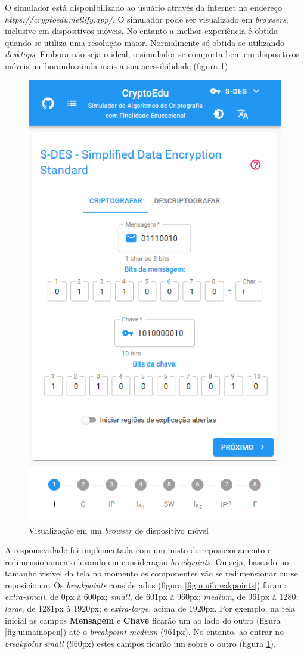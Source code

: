 O simulador está disponibilizado ao usuário através da internet no endereço \textit{https://cryptoedu.netlify.app/}. O simulador pode ser visualizado em \textit{browsers}, inclusive em dispositivos móveis. No entanto a melhor experiência é obtida quando se utiliza uma resolução maior. Normalmente só obtida se utilizando \textit{desktops}. Embora não seja o ideal, o simulador se comporta bem em dispositivos móveis melhorando ainda mais a sua acessibilidade (figura \ref{fig:simuladormobile}).

\begin{figure}[H]
    \centering
    \caption{Visualização em um \textit{browser} de dispositivo móvel}
    \label{fig:simuladormobile}
    \includegraphics[width=0.5\linewidth]{UI/UIMobile.png}
\end{figure}

A responsividade foi implementada com um misto de reposicionamento e redimensionamento levando em consideração \textit{breakpoints}. Ou seja, baseado no tamanho visível da tela no momento os componentes vão se redimensionar ou se reposicionar. Os \textit{breakpoints} considerados (figura \ref{fig:muibreakpoints}) foram: \textit{extra-small}, de 0px à 600px; \textit{small}, de 601px à 960px; \textit{medium}, de 961px à 1280; \textit{large}, de 1281px à 1920px; e \textit{extra-large}, acima de 1920px. Por exemplo, na tela inicial os campos \textbf{Mensagem} e \textbf{Chave} ficarão um ao lado do outro (figura \ref{fig:uimainopen}) até o \textit{breakpoint} \textit{medium} (961px). No entanto, ao entrar no \textit{breakpoint} \textit{small} (960px) estes campos ficarão um sobre o outro (figura \ref{fig:simuladormobile}).

